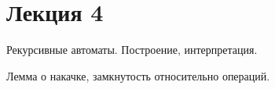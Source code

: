 \section{Лекция 4}

Рекурсивные автоматы. Построение, интерпретация.

Лемма о накачке, замкнутость относительно операций.